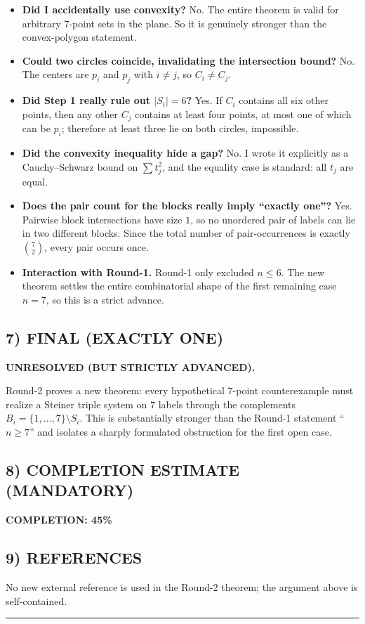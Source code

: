 \begin{itemize}
\item \textbf{Did I accidentally use convexity?} No. The entire theorem is valid for arbitrary $7$-point sets in the plane. So it is genuinely stronger than the convex-polygon statement.
\item \textbf{Could two circles coincide, invalidating the intersection bound?} No. The centers are $p_i$ and $p_j$ with $i\neq j$, so $C_i\neq C_j$.
\item \textbf{Did Step 1 really rule out $|S_i|=6$?} Yes. If $C_i$ contains all six other points, then any other $C_j$ contains at least four points, at most one of which can be $p_i$; therefore at least three lie on both circles, impossible.
\item \textbf{Did the convexity inequality hide a gap?} No. I wrote it explicitly as a Cauchy--Schwarz bound on $\sum t_j^2$, and the equality case is standard: all $t_j$ are equal.
\item \textbf{Does the pair count for the blocks really imply ``exactly one''?} Yes. Pairwise block intersections have size $1$, so no unordered pair of labels can lie in two different blocks. Since the total number of pair-occurrences is exactly $\binom72$, every pair occurs once.
\item \textbf{Interaction with Round-1.} Round-1 only excluded $n\le 6$. The new theorem settles the entire combinatorial shape of the first remaining case $n=7$, so this is a strict advance.
\end{itemize}

\subsection*{7) FINAL (EXACTLY ONE)}

\textbf{UNRESOLVED (BUT STRICTLY ADVANCED).}

Round-2 proves a new theorem: every hypothetical $7$-point counterexample must realize a Steiner triple system on $7$ labels through the complements $B_i=\{1,\dots,7\}\setminus S_i$. This is substantially stronger than the Round-1 statement ``$n\ge 7$'' and isolates a sharply formulated obstruction for the first open case.

\subsection*{8) COMPLETION ESTIMATE (MANDATORY)}

\textbf{COMPLETION: 45\%}

\subsection*{9) REFERENCES}

No new external reference is used in the Round-2 theorem; the argument above is self-contained.

\bigskip
\hrule
\bigskip

